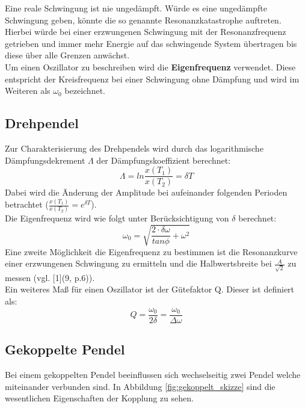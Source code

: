 \documentclass[12pt,a4paper]{article}
\begin{document}
\begin{multicols}{2}
Eine reale Schwingung ist nie ungedämpft. Würde es eine ungedämpfte Schwingung geben, könnte die so genannte Resonanzkatastrophe auftreten. Hierbei würde bei einer erzwungenen Schwingung mit der Resonanzfrequenz getrieben und immer mehr Energie auf das schwingende System übertragen bis diese über alle Grenzen anwächst.\\
Um einen Oszillator zu beschreiben wird die \textbf{Eigenfrequenz} verwendet. Diese entspricht der Kreisfrequenz bei einer Schwingung ohne Dämpfung und wird im Weiteren als $\omega_0$ bezeichnet.\\

\subsection{Drehpendel}
Zur Charakterisierung des Drehpendels wird durch das logarithmische Dämpfungsdekrement $\Lambda$ der Dämpfungskoeffizient berechnet:
$$\Lambda = ln \frac{x(T_1)}{x(T_2)} = \delta T$$
Dabei wird die Änderung der Amplitude bei aufeinander folgenden Perioden betrachtet ($\frac{x(T_1)}{x(T_2)} = e^{\delta T}$).\\
Die Eigenfrequenz wird wie folgt unter Berücksichtigung von $\delta$ berechnet:
$$ \omega_0 = \sqrt{\frac{2\cdot \delta \omega}{tan \phi} + \omega^2 }$$
Eine zweite Möglichkeit die Eigenfrequenz zu bestimmen ist die Resonanzkurve einer erzwungenen Schwingung zu ermitteln und die Halbwertsbreite bei $\frac{A}{\sqrt{2}}$ zu messen (vgl. [1](9, p.6)).\\
Ein weiteres Maß für einen Oszillator ist der Gütefaktor Q. Dieser ist definiert als:
$$Q = \frac{\omega_0}{2\delta} = \frac{\omega_0}{\Delta \omega}$$

\subsection{Gekoppelte Pendel}
Bei einem gekoppelten Pendel beeinflussen sich wechselseitig zwei Pendel welche miteinander verbunden sind. In Abbildung \ref{fig:gekoppelt_skizze} sind die wesentlichen Eigenschaften der Kopplung zu sehen.


\end{multicols}
\end{document}
